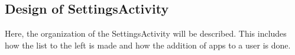 \subsection{Design of SettingsActivity}

Here, the organization of the SettingsActivity will be described.
This includes how the list to the left is made and how the addition of apps to a user is done. 